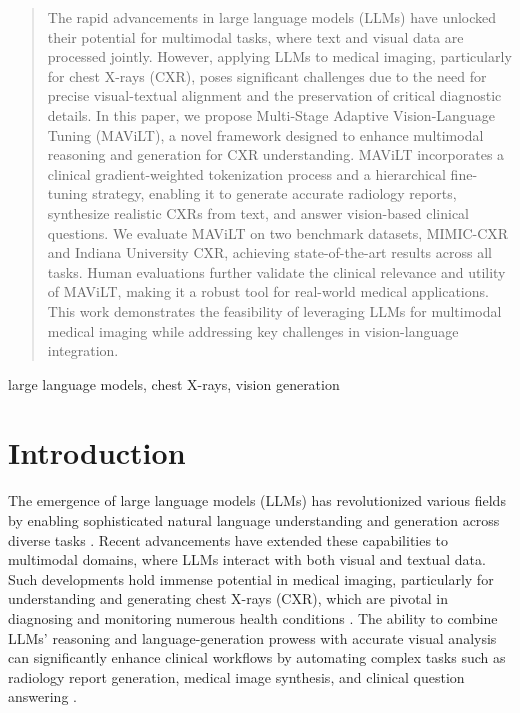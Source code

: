 \begin{abstract}
The rapid advancements in large language models (LLMs) have unlocked their potential for multimodal tasks, where text and visual data are processed jointly. However, applying LLMs to medical imaging, particularly for chest X-rays (CXR), poses significant challenges due to the need for precise visual-textual alignment and the preservation of critical diagnostic details. In this paper, we propose Multi-Stage Adaptive Vision-Language Tuning (MAViLT), a novel framework designed to enhance multimodal reasoning and generation for CXR understanding. MAViLT incorporates a clinical gradient-weighted tokenization process and a hierarchical fine-tuning strategy, enabling it to generate accurate radiology reports, synthesize realistic CXRs from text, and answer vision-based clinical questions. We evaluate MAViLT on two benchmark datasets, MIMIC-CXR and Indiana University CXR, achieving state-of-the-art results across all tasks. Human evaluations further validate the clinical relevance and utility of MAViLT, making it a robust tool for real-world medical applications. This work demonstrates the feasibility of leveraging LLMs for multimodal medical imaging while addressing key challenges in vision-language integration.
\end{abstract}

\begin{IEEEkeywords}
large language models, chest X-rays, vision generation
\end{IEEEkeywords}

\section{Introduction}

The emergence of large language models (LLMs) has revolutionized various fields by enabling sophisticated natural language understanding and generation across diverse tasks \cite{zhou2023towards,ratzlaff2024training,zhou2024less}. Recent advancements have extended these capabilities to multimodal domains, where LLMs interact with both visual and textual data. Such developments hold immense potential in medical imaging, particularly for understanding and generating chest X-rays (CXR), which are pivotal in diagnosing and monitoring numerous health conditions \cite{garg2023multimodal}. The ability to combine LLMs' reasoning and language-generation prowess with accurate visual analysis can significantly enhance clinical workflows by automating complex tasks such as radiology report generation, medical image synthesis, and clinical question answering \cite{lee2024multimodal}.

